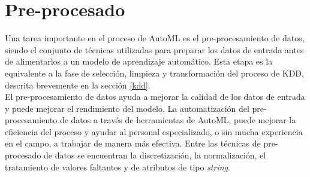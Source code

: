 \section{Pre-procesado} \label{epig:preprocesado}
Una tarea importante en el proceso de AutoML es el pre-procesamiento de datos, siendo el conjunto de técnicas utilizadas para preparar los datos de entrada antes de alimentarlos a un modelo de aprendizaje automático. Esta etapa es la equivalente a la fase de selección, limpieza y transformación del proceso de KDD, descrita brevemente en la sección \ref{kdd}. \\
El pre-procesamiento de datos ayuda a mejorar la calidad de los datos de entrada y puede mejorar el rendimiento del modelo. La automatización del pre-procesamiento de datos a través de herramientas de AutoML, puede mejorar la eficiencia del proceso y ayudar al personal especializado, o sin mucha experiencia en el campo, a trabajar de manera más efectiva. Entre las técnicas de pre-procesado de datos se encuentran la discretización, la normalización, el tratamiento de valores faltantes y de atributos de tipo \textit{string}.

